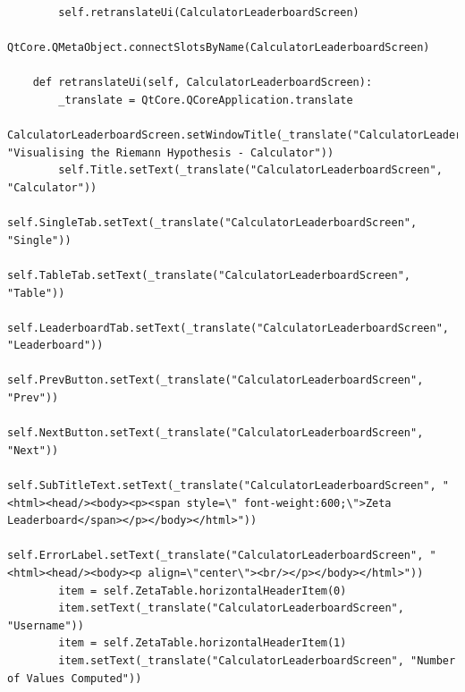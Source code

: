\documentclass{article}
\begin{document}
\begin{lstlisting}
        self.retranslateUi(CalculatorLeaderboardScreen)
        QtCore.QMetaObject.connectSlotsByName(CalculatorLeaderboardScreen)

    def retranslateUi(self, CalculatorLeaderboardScreen):
        _translate = QtCore.QCoreApplication.translate
        CalculatorLeaderboardScreen.setWindowTitle(_translate("CalculatorLeaderboardScreen", "Visualising the Riemann Hypothesis - Calculator"))
        self.Title.setText(_translate("CalculatorLeaderboardScreen", "Calculator"))
        self.SingleTab.setText(_translate("CalculatorLeaderboardScreen", "Single"))
        self.TableTab.setText(_translate("CalculatorLeaderboardScreen", "Table"))
        self.LeaderboardTab.setText(_translate("CalculatorLeaderboardScreen", "Leaderboard"))
        self.PrevButton.setText(_translate("CalculatorLeaderboardScreen", "Prev"))
        self.NextButton.setText(_translate("CalculatorLeaderboardScreen", "Next"))
        self.SubTitleText.setText(_translate("CalculatorLeaderboardScreen", "<html><head/><body><p><span style=\" font-weight:600;\">Zeta Leaderboard</span></p></body></html>"))
        self.ErrorLabel.setText(_translate("CalculatorLeaderboardScreen", "<html><head/><body><p align=\"center\"><br/></p></body></html>"))
        item = self.ZetaTable.horizontalHeaderItem(0)
        item.setText(_translate("CalculatorLeaderboardScreen", "Username"))
        item = self.ZetaTable.horizontalHeaderItem(1)
        item.setText(_translate("CalculatorLeaderboardScreen", "Number of Values Computed"))
\end{lstlisting}
\end{document}
